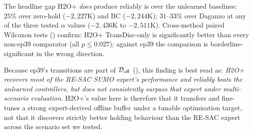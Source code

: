 The headline gap H2O+ \emph{does} produce reliably is over the unlearned baselines:
$25\%$ over zero-hold ($-2{,}227$K) and BC ($-2{,}244$K);
$31$--$33\%$ over Daganzo at any of the three tested $\alpha$ values ($-2{,}436$K to $-2{,}511$K).
Cross-method paired Wilcoxon tests () confirm: H2O+ TransDisc-only is significantly better than every non-ep39 comparator (all $p \leq 0.027$); against ep39 the comparison is borderline-significant in the wrong direction.

Because ep39's transitions are part of $\mathcal{D}_{\mathrm{off}}$ (), this finding is best read as: \emph{H2O+ recovers most of the RE-SAC SUMO expert's performance and reliably beats the unlearned controllers, but does not consistently surpass that expert under multi-scenario evaluation}.
H2O+'s value here is therefore that it transfers and fine-tunes a strong expert-derived offline buffer under a tunable optimisation target, not that it discovers strictly better holding behaviour than the RE-SAC expert across the scenario set we tested.

\begin{table}[t]
\centering
\small
\caption{Paired-scenario statistics with the \emph{same-fidelity oracle} (SUMO-online H2O+ TransDisc-only) as base, on the $9$ paired scenarios of . Mean difference reported with bootstrap $95\%$ CI ($2{,}000$ resamples) and Wilcoxon signed-rank $p$-value. Positive mean difference = the SUMO-online oracle H2O+ has higher (better) cumulative reward than the comparator. This table is informative for ranking H2O+ variants under matched-fidelity training but does not directly answer the deployment question;  reports the same comparisons with the deployment-relevant SIM-online H2O+ Contrastive variant as base.}
\label{tab:paired_stats}
\end{table}

